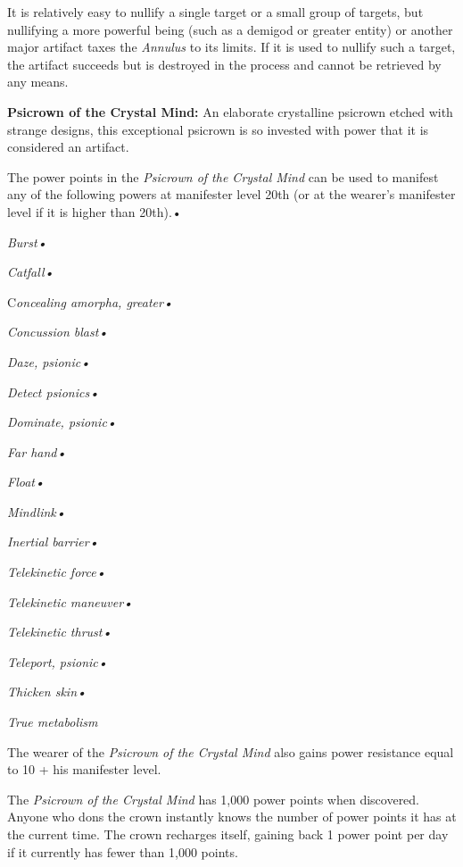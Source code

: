 \documentclass{article}
\begin{document}
It is relatively easy to nullify a single target or a small group of targets, but 
nullifying a more powerful being (such as a demigod or greater entity) or another 
major artifact taxes the \textit{Annulus }to its limits. If it is used to nullify 
such a target, the artifact succeeds but is destroyed in the process and cannot 
be retrieved by any means.

\textbf{Psicrown of the Crystal Mind:} An elaborate crystalline psicrown etched 
with strange designs, this exceptional psicrown is so invested with power that 
it is considered an artifact. 

The power points in the \textit{Psicrown of the Crystal Mind }can be used to manifest 
any of the following powers at manifester level 20th (or at the wearer's manifester 
level if it is higher than 20th).• 

\parindent=3pt
\textit{Burst• }

\textit{Catfall• }

\parindent=0pt
C\textit{oncealing amorpha, greater• }

\parindent=3pt
\textit{Concussion blast• }

\textit{Daze, psionic• }

\parindent=7pt
\textit{Detect psionics• }

\parindent=3pt
\textit{Dominate, psionic• }

\textit{Far hand• }

\parindent=7pt
\textit{Float• }

\parindent=3pt
\textit{Mindlink• }

\textit{Inertial barrier• }

\parindent=7pt
\textit{Telekinetic force• }

\parindent=3pt
\textit{Telekinetic maneuver• }

\textit{Telekinetic thrust• }

\parindent=7pt
\textit{Teleport, psionic• }

\parindent=3pt
\textit{Thicken skin• }

\textit{True metabolism}

\parindent=0pt
The wearer of the \textit{Psicrown of the Crystal Mind }also gains power resistance 
equal to 10 + his manifester level.

The \textit{Psicrown of the Crystal Mind }has 1,000 power points when discovered. 
Anyone who dons the crown instantly knows the number of power points it has at 
the current time. The crown recharges itself, gaining back 1 power point per day 
if it currently has fewer than 1,000 points.
\end{document}
